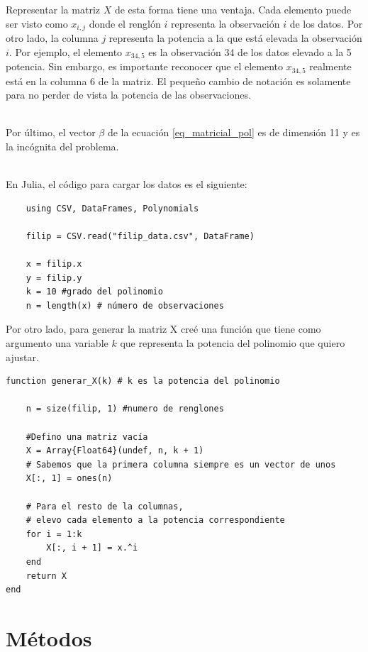 Representar la matriz $X$ de esta forma tiene una ventaja. Cada elemento puede ser visto como $x_{i, j}$ donde el renglón $i$ representa la observación $i$ de los datos. Por otro lado, la columna $j$ representa la potencia a la que está elevada la observación $i$. Por ejemplo, el elemento $x_{34, 5}$ es la observación 34 de los datos elevado a la 5 potencia. Sin embargo, es importante reconocer que el elemento $x_{34, 5}$ realmente está en la columna 6 de la matriz. El pequeño cambio de notación es solamente para no perder de vista la potencia de las observaciones. 

\\

Por último, el vector $\beta$ de la ecuación \ref{eq_matricial_pol} es de dimensión 11 y es la incógnita del problema. 

\\

En Julia, el código para cargar los datos es el siguiente: 

\begin{verbatim}
    using CSV, DataFrames, Polynomials
    
    filip = CSV.read("filip_data.csv", DataFrame)

    x = filip.x
    y = filip.y
    k = 10 #grado del polinomio
    n = length(x) # número de observaciones
\end{verbatim}

Por otro lado, para generar la matriz X creé una función que tiene como argumento una variable $k$ que representa la potencia del polinomio que quiero ajustar. 

\begin{verbatim}
function generar_X(k) # k es la potencia del polinomio

    n = size(filip, 1) #numero de renglones
    
    #Defino una matriz vacía
    X = Array{Float64}(undef, n, k + 1)
    # Sabemos que la primera columna siempre es un vector de unos
    X[:, 1] = ones(n)
    
    # Para el resto de la columnas,
    # elevo cada elemento a la potencia correspondiente
    for i = 1:k
        X[:, i + 1] = x.^i
    end
    return X
end
\end{verbatim}


\section{Métodos}

